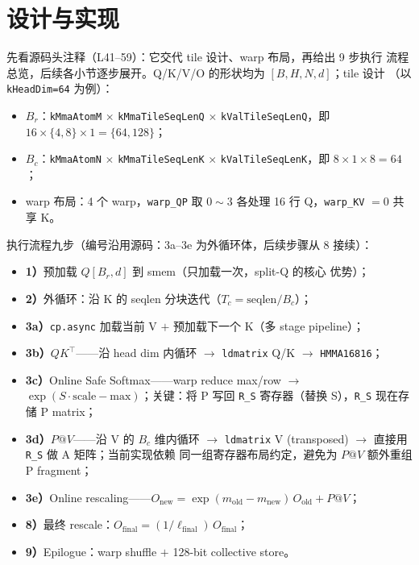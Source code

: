 \section{设计与实现}

先看源码头注释（L41--59）：它交代 tile 设计、warp 布局，再给出 9 步执行
流程总览，后续各小节逐步展开。Q/K/V/O 的形状均为 $[B, H, N, d]$；tile 设计
（以 \texttt{kHeadDim=64} 为例）：
\begin{itemize}
  \item $B_r$：\texttt{kMmaAtomM} $\times$ \texttt{kMmaTileSeqLenQ} $\times$
        \texttt{kValTileSeqLenQ}，即 $16 \times \{4, 8\} \times 1 = \{64, 128\}$；
  \item $B_c$：\texttt{kMmaAtomN} $\times$ \texttt{kMmaTileSeqLenK} $\times$
        \texttt{kValTileSeqLenK}，即 $8 \times 1 \times 8 = 64$；
  \item warp 布局：4 个 warp，\texttt{warp\_QP} 取 $0 \sim 3$ 各处理 16 行
        Q，\texttt{warp\_KV} $= 0$ 共享 K。
\end{itemize}

执行流程九步（编号沿用源码：3a--3e 为外循环体，后续步骤从 8 接续）：
\begin{itemize}
  \item \textbf{1）}预加载 $Q[B_r, d]$ 到 smem（只加载一次，split-Q 的核心
        优势）；
  \item \textbf{2）}外循环：沿 K 的 seqlen 分块迭代（$T_c =
        \mathrm{seqlen}/B_c$）；
  \item \textbf{3a）}\texttt{cp.async} 加载当前 V $+$ 预加载下一个 K（多
        stage pipeline）；
  \item \textbf{3b）}$QK^{\top}$——沿 head dim 内循环 $\to$ \texttt{ldmatrix}
        Q/K $\to$ \texttt{HMMA16816}；
  \item \textbf{3c）}Online Safe Softmax——warp reduce max/row $\to$
        $\exp(S \cdot \mathrm{scale} - \mathrm{max})$；关键：将 P 写回
        \texttt{R\_S} 寄存器（替换 S），\texttt{R\_S} 现在存储 P matrix；
  \item \textbf{3d）}$P@V$——沿 V 的 $B_c$ 维内循环 $\to$ \texttt{ldmatrix}
        V (transposed) $\to$ 直接用 \texttt{R\_S} 做 A 矩阵；当前实现依赖
        同一组寄存器布局约定，避免为 $P@V$ 额外重组 P fragment；
  \item \textbf{3e）}Online rescaling——$O_{\text{new}} =
        \exp(m_{\text{old}} - m_{\text{new}})\,O_{\text{old}} + P@V$；
  \item \textbf{8）}最终 rescale：$O_{\text{final}} =
        (1/\ell_{\text{final}})\,O_{\text{final}}$；
  \item \textbf{9）}Epilogue：warp shuffle $+$ 128-bit collective store。
\end{itemize}

